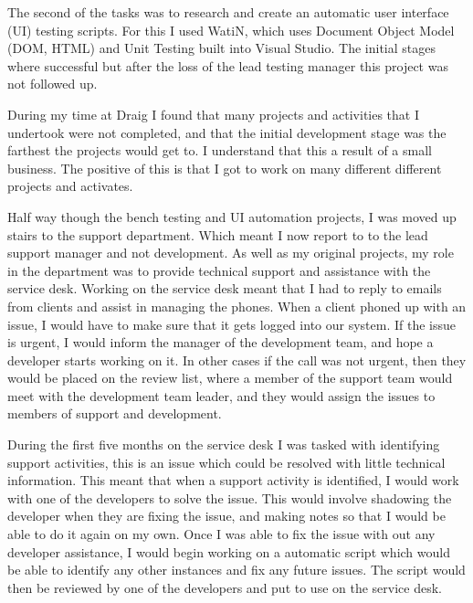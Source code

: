 \documentclass[paper=a4, fontsize=11pt]{scrartcl}	%
\begin{document}
The second of the tasks was to research and create an automatic user interface (UI) testing scripts. For this I used WatiN\cite{WatiN}, which uses Document Object Model (DOM, HTML) and Unit Testing built into Visual Studio. The initial stages where successful but after the loss of the lead testing manager this project was not followed up.

During my time at Draig I found that many projects and activities that I undertook were not completed, and that the initial development stage was the farthest the projects would get to. I understand that this a result of a small business. The positive of this is that I got to work on many different different projects and activates. 

Half way though the bench testing and UI automation projects, I was moved up stairs to the support department. Which meant I now report to to the lead support manager and not development. As well as my original projects, my role in the department was to provide technical support and assistance with the service desk. Working on the service desk meant that I had to reply to emails from clients and assist in managing the phones. When a client phoned up with an issue, I would have to make sure that it gets logged into our system. If the issue is urgent, I would inform the manager of the development team, and hope a developer starts working on it. In other cases if the call was not urgent, then they would be placed on the review list, where a member of the support team would meet with the development team leader, and they would assign the issues to members of  support and development.

During the first five months on the service desk I was tasked with identifying support activities, this is an issue which could be resolved with little technical information. This meant that when a support activity is identified, I would work with one of the developers to solve the issue. This would involve shadowing the developer when they are fixing the issue, and making notes so that I would be able to do it again on my own. Once I was able to fix the issue with out any developer assistance, I would begin working on a automatic script which would be able to identify any other instances and fix any future issues. The script would then be reviewed by one of the developers and put to use on the service desk.
\end{document}
